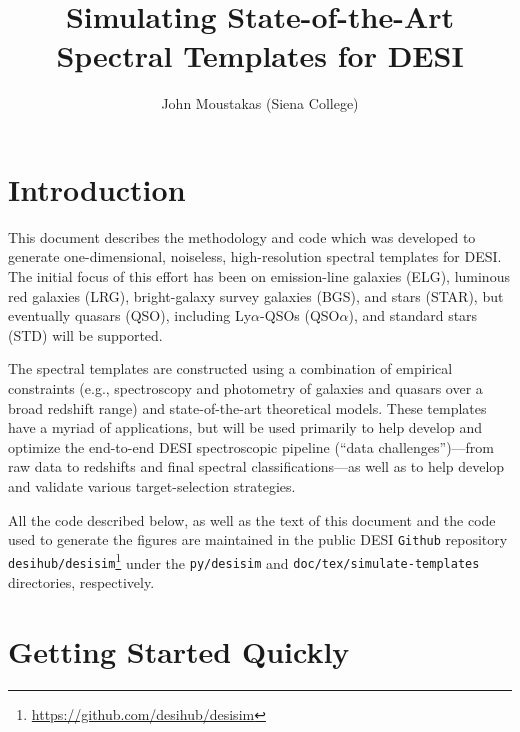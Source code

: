 \documentclass[11pt]{article}
\begin{document}
\title{Simulating State-of-the-Art Spectral Templates for DESI} 

\author{John Moustakas (Siena College)}
\maketitle


\section{Introduction}

This document describes the methodology and code which was developed to generate
one-dimensional, noiseless, high-resolution spectral templates for DESI.  The
initial focus of this effort has been on emission-line galaxies (ELG), luminous
red galaxies (LRG), bright-galaxy survey galaxies (BGS), and stars (STAR), but
eventually quasars (QSO), including Ly$\alpha$-QSOs (QSO$\alpha$), and standard
stars (STD) will be supported.

The spectral templates are constructed using a combination of empirical
constraints (e.g., spectroscopy and photometry of galaxies and quasars over a
broad redshift range) and state-of-the-art theoretical models.  These templates
have a myriad of applications, but will be used primarily to help develop and
optimize the end-to-end DESI spectroscopic pipeline (``data challenges'')---from
raw data to redshifts and final spectral classifications---as well as to help
develop and validate various target-selection strategies.

All the code described below, as well as the text of this document and the code
used to generate the figures are maintained in the public DESI {\tt Github}
repository {\tt
  desihub/desisim}\footnote{\url{https://github.com/desihub/desisim}} under the
{\tt py/desisim} and {\tt doc/tex/simulate-templates} directories, respectively.


\section{Getting Started Quickly}
\end{document}
